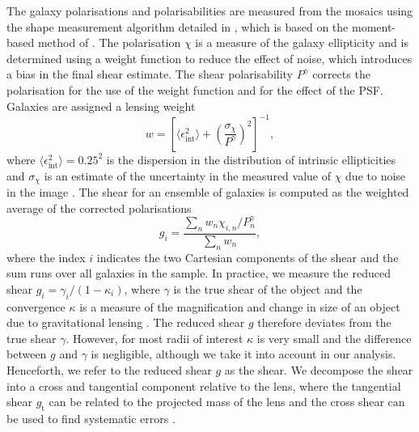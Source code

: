 \documentclass[useAMS,usenatbib]{mnras}
\begin{document}
The galaxy polarisations and polarisabilities are measured from the mosaics using the shape measurement algorithm detailed in , which is based on the moment-based method of \cite{kaiser95}. The polarisation $\chi$  is a measure of the galaxy ellipticity and is determined using a weight function to reduce the effect of noise, which introduces a bias in the final shear estimate. The shear polarisability $P^\gamma$ corrects the polarisation for the use of the weight function and for the effect of the PSF. Galaxies are assigned a lensing weight
\begin{equation}
 w = \left[ \langle \epsilon_{\mathrm{int}}^2 \rangle + \left( \dfrac{\sigma_\chi}{P^\gamma} \right)^2 \right]^{-1} ,
 \label{eq:lensweight}
\end{equation}
where $\langle \epsilon_{\mathrm{int}}^2 \rangle=0.25^2$ is the dispersion in the distribution of intrinsic ellipticities and $\sigma_\chi$ is an estimate of the uncertainty in the measured value of $\chi$ due to noise in the image \citep{hoekstra00}. The shear for an ensemble of galaxies is computed as the weighted average of the corrected polarisations 
\begin{equation}
 g_i = \dfrac{\sum\limits_n w_n \chi_{i,n}/P^\gamma_n}{\sum\limits_n w_n} ,
 \label{eq:redshear}
\end{equation}
where the index $i$ indicates the two Cartesian components of the shear and the sum runs over all galaxies in the sample. 
In practice, we measure the reduced shear $g_i=\gamma_i/(1-\kappa_i)$, where $\gamma$ is the true shear of the object and the convergence $\kappa$ is a measure of the magnification and change in size of an object due to gravitational lensing \citep{bartelmann01}. The reduced shear $g$ therefore deviates from the true shear $\gamma$. However, for most radii of interest $\kappa$ is very small and the difference between $g$ and $\gamma$ is negligible, although we take it into account in our analysis. Henceforth, we refer to the reduced shear $g$ as the shear. We decompose the shear into a cross and tangential component relative to the lens, where the tangential shear $g_\mathrm{t}$ can be related to the projected mass of the lens and the cross shear can be used to find systematic errors \citep{schneider03}. 
\end{document}

